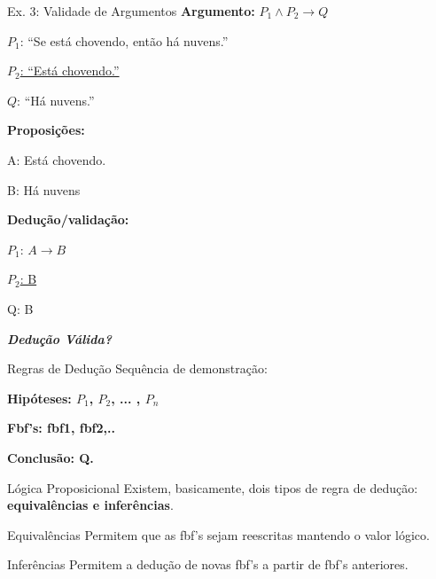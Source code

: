 \documentclass[aspectratio=169]{beamer}
\begin{document}
\begin{frame}{Ex. 3: Validade de Argumentos}
    \textbf{Argumento:} $P_1 \wedge P_2 \rightarrow Q$

    $P_1$: ``Se está chovendo, então há nuvens.''

    \underline{$P_2$: ``Está chovendo.''}

    $Q$: ``Há nuvens.''

    \vspace{3mm}
    \textbf{Proposições:}

    A: Está chovendo.

    B: Há nuvens
    \vspace{3mm}

    \textbf{Dedução/validação:}

    $P_1$: $A \rightarrow B$

    \underline{$P_2$: B}

    Q: B
    \vspace{4mm}

    \textit{\textbf{Dedução Válida?}}


\end{frame}

\begin{frame}{Regras de Dedução}
    Sequência de demonstração:
    \vspace*{4mm}

    \textbf{Hipóteses: $P_1$, $P_2$, ... , $P_n$}
    \vspace*{2mm}

    \textbf{Fbf's: fbf1, fbf2,..}
    \vspace*{2mm}

    \textbf{Conclusão: Q.}

\end{frame}

\begin{frame}{Lógica Proposicional}
    Existem, basicamente, dois tipos de regra de dedução: \textbf{equivalências e inferências}.
    \vspace*{4mm}

    \begin{block}{Equivalências}
        Permitem que as fbf's sejam reescritas mantendo o valor lógico.
    \end{block}

    \vspace*{4mm}

    \begin{block}{Inferências}
        Permitem a dedução de novas fbf's a partir de fbf's anteriores.
    \end{block}


\end{frame}
\end{document}
